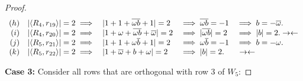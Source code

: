 \begin{lemma}
\begin{proof}
$$\begin{array}{rcllll}
      (h) & |\langle R_{4},r_{19}\rangle|=2 \implies & |1+1+\overline{\omega b}+1|=2       &\implies \overline{\omega b} = -1     &\implies b = -\overline{\omega}.    \\
      (i) & |\langle R_{4},r_{20}\rangle|=2 \implies & |1+\omega+\overline{\omega b}+\overline{\omega}|=2 &\implies |\overline{\omega b}| = 2    &\implies |b| = 2.   \rightarrow\leftarrow \\
      (j) & |\langle R_{5},r_{21}\rangle|=2 \implies & |1+1+\omega\overline{b}+1|=2            &\implies \omega\overline{b} = -1          &\implies b = -\omega.          \\
      (k) & |\langle R_{5},r_{22}\rangle|=2 \implies & |1+\overline{\omega}+b+\omega|=2             &\implies |b|=2.                 & ~                  \rightarrow\leftarrow
     \end{array}
     $$

   {\bf Case 3:} Consider all rows that are orthogonal with row 3 of $W_5$:


\end{proof}
\end{lemma}
